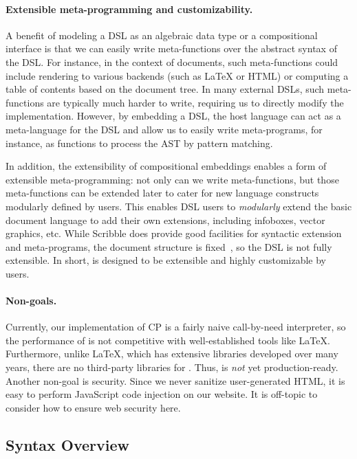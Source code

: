 \paragraph{Extensible meta-programming and customizability.}
A benefit of modeling a DSL as an algebraic data type or a compositional
interface is that we can easily write meta-functions over the abstract syntax of
the DSL. For instance, in the context of documents, such meta-functions could
include rendering to various backends (such as \LaTeX{} or HTML) or computing a
table of contents based on the document tree. In many external DSLs, such
meta-functions are typically much harder to write, requiring us to directly
modify the implementation. However, by embedding a DSL, the host language can
act as a meta-language for the DSL and allow us to easily write meta-programs,
for instance, as functions to process the AST by pattern matching.

In addition, the extensibility of compositional embeddings enables a form of
extensible meta-programming: not only can we write meta-functions, but those
meta-functions can be extended later to cater for new language constructs
modularly defined by users. This enables DSL users to \emph{modularly} extend
the basic document language to add their own extensions, including infoboxes,
vector graphics, etc. While Scribble does provide good facilities for syntactic
extension and meta-programs, the document structure is fixed~\citep{scribble},
so the DSL is not fully extensible. In short, \ExT is designed to be extensible
and highly customizable by users. 

\paragraph{Non-goals.}
Currently, our implementation of CP is a fairly naive call-by-need interpreter,
so the performance of \ExT is not competitive with well-established tools like
\LaTeX. Furthermore, unlike \LaTeX, which has extensive libraries developed over
many years, there are no third-party libraries for \ExT. Thus, \ExT is
\emph{not} yet production-ready. Another non-goal is security. Since we never
sanitize user-generated HTML, it is easy to perform JavaScript code injection on
our website. It is off-topic to consider how to ensure web security here.

\subsection{Syntax Overview}

